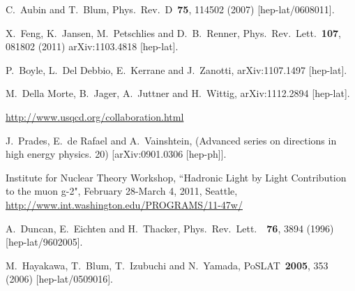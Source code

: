 \begin{thebibliography}{99}
  C.~Aubin and T.~Blum,
  Phys.\ Rev.\ D\ {\bf 75}, 114502  (2007)
  [hep-lat/0608011].

  X.~Feng, K.~Jansen, M.~Petschlies and D.~B.~Renner,
  Phys.\ Rev.\ Lett.\ {\bf 107}, 081802  (2011) 
  arXiv:1103.4818 [hep-lat].

  P.~Boyle, L.~Del Debbio, E.~Kerrane and J.~Zanotti,
  arXiv:1107.1497 [hep-lat].
  
  M.~Della Morte, B.~Jager, A.~Juttner and H.~Wittig,
  arXiv:1112.2894 [hep-lat].
  
\url{http://www.usqcd.org/collaboration.html}

  J.~Prades, E.~de Rafael and A.~Vainshtein,
  (Advanced series on directions in high energy physics. 20)
  [arXiv:0901.0306 [hep-ph]].

Institute for Nuclear Theory Workshop, ``Hadronic Light by Light Contribution to the muon g-2", February 28-March 4, 2011, Seattle, \url{http://www.int.washington.edu/PROGRAMS/11-47w/}

  A.~Duncan, E.~Eichten and H.~Thacker,
  Phys.\ Rev.\ Lett.\ \ {\bf 76}, 3894  (1996)
  [hep-lat/9602005].

  M.~Hayakawa, T.~Blum, T.~Izubuchi and N.~Yamada,
  PoSLAT\ {\bf 2005}, 353  (2006)
  [hep-lat/0509016].


\end{thebibliography}
